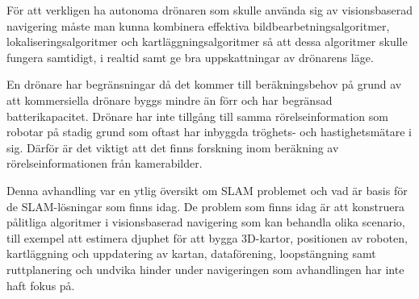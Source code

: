 För att verkligen ha autonoma drönaren som skulle använda sig av visionsbaserad navigering måste man kunna kombinera effektiva bildbearbetningsalgoritmer, lokaliseringsalgoritmer och kartläggningsalgoritmer så att dessa algoritmer skulle fungera samtidigt, i realtid samt ge bra uppskattningar av drönarens läge. 

En drönare har begränsningar då det kommer till beräkningsbehov på grund av att kommersiella drönare byggs mindre än förr och har begränsad batterikapacitet. Drönare har inte tillgång till samma rörelseinformation som robotar på stadig grund som oftast har inbyggda tröghets- och hastighetsmätare i sig. Därför är det viktigt att det finns forskning inom beräkning av rörelseinformationen från kamerabilder. 

Denna avhandling var en ytlig översikt om SLAM problemet och vad är basis för de SLAM-lösningar som finns idag. De problem som finns idag är att konstruera pålitliga algoritmer i visionsbaserad navigering som kan behandla olika scenario, till exempel att estimera djuphet för att bygga 3D-kartor, positionen av roboten, kartläggning och uppdatering av kartan, dataförening, loopstängning samt ruttplanering och undvika hinder under navigeringen som avhandlingen har inte haft fokus på.

